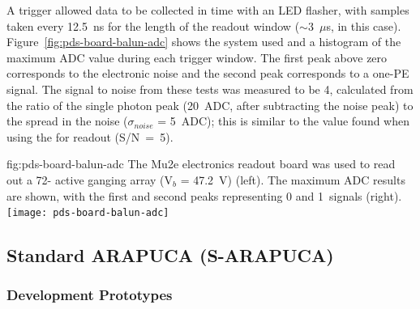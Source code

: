 A trigger allowed data to be collected in time with an LED flasher, with samples taken every 12.5~ns for the length of the readout window ($\sim$3~$\mu$s, in this case). Figure~\ref{fig:pds-board-balun-adc} shows the system used and a histogram of the maximum ADC value during each trigger window. The first peak above zero corresponds to the electronic noise and the second peak corresponds to a one-PE signal. The signal to noise from these tests was measured to be 4, calculated from the ratio of the single photon peak (20~ADC, after subtracting the noise peak) to the spread in the noise ($\sigma_{noise}$ = 5~ADC); this is similar to the value found when using the  for readout (S/N~=~5).

\begin{dunefigure}
{fig:pds-board-balun-adc}
{The Mu2e electronics readout board was used to read out a 72- active ganging array (V$_b$ = \SI{47.2}{V}) (left). The maximum ADC results are shown, with the first and second peaks representing 0 and 1~\phel signals (right).}
\texttt{[image: pds-board-balun-adc]} 
\vspace{-7.0cm}
\end{dunefigure}


\subsection{Standard ARAPUCA (S-ARAPUCA)}
\label{sec:sarapuca-prototypes}


\subsubsection{Development Prototypes}
\label{sec:valid-initial}

